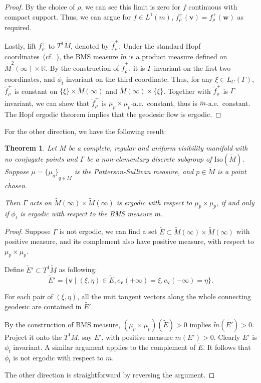 \documentclass[reqno,11pt]{article}
\newtheorem{theorem}{Theorem}[section]
\theoremstyle{definition}
\theoremstyle{remark}
\numberwithin{equation}{section}
\begin{document}
\begin{proof}
By the choice of $\rho$, we can see this limit is zero for $f$ continuous with compact support. Thus, we can argue for $f\in L^1(m)$, $f_{\rho}^{+}(\bm{v})=f_{\rho}^{+}(\bm{w})$ as required. 

Lastly, lift $f_{\rho}^{+}$ to $T^1\widetilde{M}$, denoted by $\tilde{f}_{\rho}^{+}$. Under the standard Hopf coordinates~(cf.~\cite{Ni}), the BMS measure $\tilde{m}$ is a product measure defined on $\widetilde{M}^2(\infty)\times\mathbb{R}$. By the construction of $\tilde{f}_{\rho}^{+}$, it is $\Gamma$-invariant on the first two coordinates, and $\tilde{\phi}_t$ invariant on the third coordinate. Thus, for any $\xi\in L_C(\Gamma)$, $\tilde{f}_{\rho}^{+}$ is constant on $\{\xi\}\times\widetilde{M}(\infty)$ and $\widetilde{M}(\infty)\times\{\xi\}$. Together with $\tilde{f}_{\rho}^{+}$ is $\Gamma$ invariant, we can show that $\tilde{f}_{\rho}^{+}$ is $\mu_p\times\mu_p$-a.e.\ constant, thus is $\tilde{m}$-a.e.\ constant. The Hopf ergodic theorem implies that the geodesic flow is ergodic.
\end{proof}

For the other direction, we have the following result:

\begin{theorem}\label{thm_6_7}
    Let $M$ be a complete, regular and uniform visibility manifold with no conjugate points and $\Gamma$ be a non-elementary discrete subgroup of $\text{Iso}(\widetilde{M})$. Suppose $\mu={\{\mu_q\}}_{q\in\widetilde{M}}$ is the Patterson-Sullivan measure, and $p\in\widetilde{M}$ is a point chosen.

	Then $\Gamma$ acts on $\widetilde{M}(\infty)\times\widetilde{M}(\infty)$ is ergodic with respect to $\mu_p\times\mu_p$, if and only if $\phi_t$ is ergodic with respect to the BMS measure $m$.
\end{theorem}

\begin{proof}
	Suppose $\Gamma$ is not ergodic, we can find a set $\widetilde{E}\subset\widetilde{M}(\infty)\times\widetilde{M}(\infty)$ with positive measure, and its complement also have positive measure, with respect to $\mu_p\times\mu_p$.

	Define $\widetilde{E}'\subset T^1\widetilde{M}$ as following:
	\begin{displaymath}
        \widetilde{E}'=\{\bm{v}\mid (\xi,\eta)\in \widetilde{E}, c_{\bm{v}}(+\infty)=\xi, c_{\bm{v}}(-\infty)=\eta\}.
	\end{displaymath}

	For each pair of $(\xi,\eta)$, all the unit tangent vectors along the whole connecting geodesic are contained in $\widetilde{E'}$.

	By the construction of BMS measure, $(\mu_p\times\mu_p)(\widetilde{E})>0$ implies $\widetilde{m}(\widetilde{E'})>0$. Project it onto the $T^1M$, say $E'$, with positive measure $m(E')>0$. Clearly $E'$ is $\phi_t$ invariant. A similar argument applies to the complement of $\widetilde{E}$. It follows that $\phi_t$ is not ergodic with respect to $m$.

	The other direction is straightforward by reversing the argument.
\end{proof}
\end{document}
